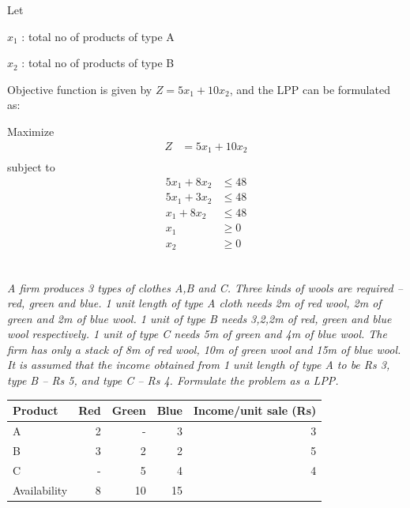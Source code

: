 \documentclass[12pt]{article}
\begin{document}
Let 

$x_1$ : total no of products of type A

$x_2$ : total no of products of type B

Objective function is given by $Z=5x_1 + 10x_2$, and the LPP can be formulated as:

Maximize
\begin{align*}
Z           & =5x_1 + 10x_2 \\
\end{align*}
subject to
\begin{align*}
5x_1 + 8x_2 & \le 48        \\
5x_1 + 3x_2 & \le 48        \\
x_1 + 8x_2  & \le 48        \\
x_1         & \ge 0         \\
x_2         & \ge 0         \\
\end{align*}
\subsection{}

\emph{A firm produces 3 types of clothes A,B and C. Three kinds of wools are required -- red, green and blue. 1 unit length of type A cloth needs 2m of red wool, 2m of green and 2m of blue wool. 1 unit of type B needs 3,2,2m of red, green and blue wool respectively. 1 unit of type C needs 5m of green and 4m of blue wool. The firm has only a stack of 8m of red wool, 10m of green wool and 15m of blue wool. It is assumed that the income obtained from 1 unit length of type A to be Rs 3, type B -- Rs 5, and type C -- Rs 4. Formulate the problem as a LPP.}

\begin{center}
\begin{tabular}{|l|rrr|r|}
\hline
 Product       &  Red  &  Green  &  Blue  &  Income/unit sale (Rs)  \\
\hline
 A             &    2  &      -  &     3  &                      3  \\
 B             &    3  &      2  &     2  &                      5  \\
 C             &    -  &      5  &     4  &                      4  \\
\hline
 Availability  &    8  &     10  &    15  &                         \\
\hline
\end{tabular}
\end{center}
\end{document}
